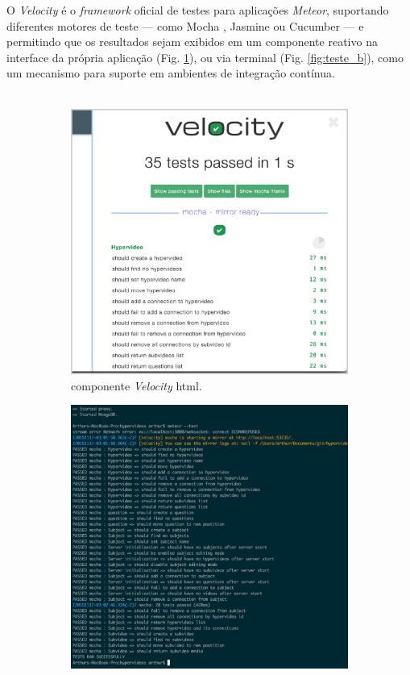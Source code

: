 O \textit{Velocity} é o \textit{framework} oficial de testes para aplicações \textit{Meteor}, suportando diferentes motores de teste --- como Mocha \cite{mocha2015}, Jasmine \cite{jasmine2015} ou Cucumber \cite{cucumber2015} --- e permitindo que os resultados sejam exibidos em um componente reativo na interface da própria aplicação (Fig. \ref{fig:teste_a}), ou via terminal (Fig. \ref{fig:teste_b}), como um mecanismo para suporte em ambientes de integração contínua.
\\
\\
\begin{figure}[h!]
	\centering
	\begin{subfigure}{.45\textwidth}
  		\centering
  		\includegraphics[width=.95\linewidth]{figuras/teste_a.eps}
  		\caption{componente \textit{Velocity} html.}
  		\label{fig:teste_a}
	\end{subfigure}%
	\begin{subfigure}{.45\textwidth}
  		\centering
  		\includegraphics[width=.95\linewidth]{figuras/teste_b.eps}

\end{subfigure}
\end{figure}
